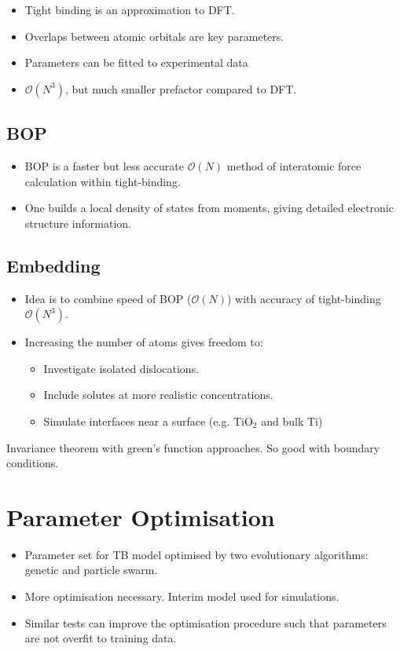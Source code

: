 \documentclass[11pt]{article}
\begin{document}
\begin{itemize}
\item Tight binding is an approximation to DFT.
\item Overlaps between atomic orbitals are key parameters.
\item Parameters can be fitted to experimental data
\item \(\mathcal{O}(N^3)\), but much smaller prefactor compared to DFT.
\end{itemize}

\subsection*{BOP}
\label{sec:org3a1ab53}

\begin{itemize}
\item BOP is a faster but less accurate \(\mathcal{O}(N)\) method of interatomic
force calculation within tight-binding.
\item One builds a local density of states from moments, giving detailed
electronic structure information.
\end{itemize}


\subsection*{Embedding}
\label{sec:orgba9c5a8}

\begin{itemize}
\item Idea is to combine speed of BOP (\(\mathcal{O}(N)\)) with accuracy of
tight-binding \(\mathcal{O}(N^3)\).
\item Increasing the number of atoms gives freedom to:
\begin{itemize}
\item Investigate isolated dislocations.
\item Include solutes at more realistic concentrations.
\item Simulate interfaces near a surface (e.g. TiO\(_2\) and
bulk Ti)
\end{itemize}
\end{itemize}
\begin{NOTES}
Invariance theorem with green's function approaches. So good with boundary
conditions. 
\end{NOTES}


\section*{Parameter Optimisation}
\label{sec:org4a1103a}
\begin{itemize}
\item Parameter set for TB model optimised by two evolutionary algorithms: genetic
and particle swarm.
\item More optimisation necessary. Interim model used for simulations.
\item Similar tests can improve the optimisation procedure such
that parameters are not overfit to training data.
\end{itemize}
\end{document}
